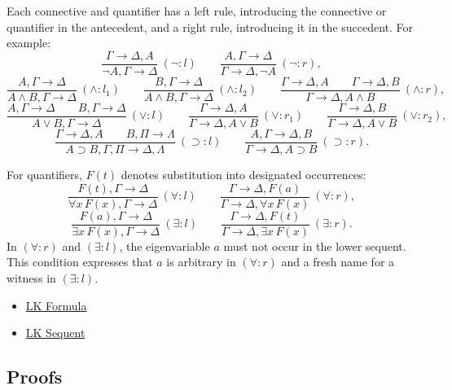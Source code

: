 \begin{remark*}[Exposition]
Each connective and quantifier has a left rule, introducing the connective or
quantifier in the antecedent, and a right rule, introducing it in the
succedent. For example:
\[
\frac{\Gamma \to \Delta,A}{\lnot A,\Gamma \to \Delta}\ (\lnot:l)
\qquad
\frac{A,\Gamma \to \Delta}{\Gamma \to \Delta,\lnot A}\ (\lnot:r),
\]
\[
\frac{A,\Gamma \to \Delta}{A \land B,\Gamma \to \Delta}\ (\land:l_1)
\qquad
\frac{B,\Gamma \to \Delta}{A \land B,\Gamma \to \Delta}\ (\land:l_2)
\qquad
\frac{\Gamma \to \Delta,A \qquad \Gamma \to \Delta,B}
     {\Gamma \to \Delta,A \land B}\ (\land:r),
\]
\[
\frac{A,\Gamma \to \Delta \qquad B,\Gamma \to \Delta}
     {A \lor B,\Gamma \to \Delta}\ (\lor:l)
\qquad
\frac{\Gamma \to \Delta,A}{\Gamma \to \Delta,A \lor B}\ (\lor:r_1)
\qquad
\frac{\Gamma \to \Delta,B}{\Gamma \to \Delta,A \lor B}\ (\lor:r_2),
\]
\[
\frac{\Gamma \to \Delta,A \qquad B,\Pi \to \Lambda}
     {A \supset B,\Gamma,\Pi \to \Delta,\Lambda}\ (\supset:l)
\qquad
\frac{A,\Gamma \to \Delta,B}{\Gamma \to \Delta,A \supset B}\ (\supset:r).
\]
\end{remark*}

\begin{remark*}[Exposition]
For quantifiers, $F(t)$ denotes substitution into designated occurrences:
\[
\frac{F(t),\Gamma \to \Delta}
     {\forall x\,F(x),\Gamma \to \Delta}\ (\forall:l)
\qquad
\frac{\Gamma \to \Delta,F(a)}
     {\Gamma \to \Delta,\forall x\,F(x)}\ (\forall:r),
\]
\[
\frac{F(a),\Gamma \to \Delta}
     {\exists x\,F(x),\Gamma \to \Delta}\ (\exists:l)
\qquad
\frac{\Gamma \to \Delta,F(t)}
     {\Gamma \to \Delta,\exists x\,F(x)}\ (\exists:r).
\]
In $(\forall:r)$ and $(\exists:l)$, the eigenvariable $a$ must not occur in
the lower sequent. This condition expresses that $a$ is arbitrary in
$(\forall:r)$ and a fresh name for a witness in $(\exists:l)$.
\end{remark*}

\begin{dependencies}
\begin{itemize}
  \item \hyperref[def:lk-formula]{LK Formula}
  \item \hyperref[def:lk-sequent]{LK Sequent}
\end{itemize}
\end{dependencies}

\subsection{Proofs}

